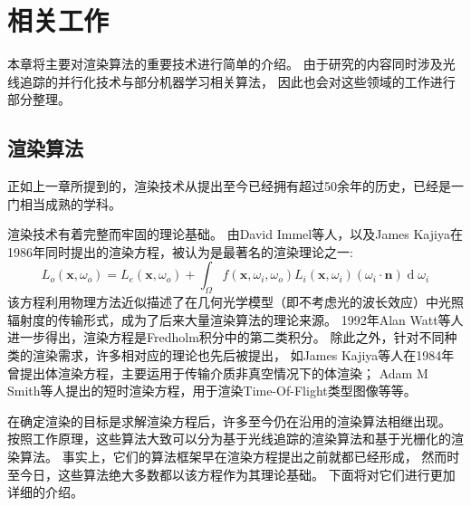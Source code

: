 \chapter{相关工作}
\label{cha:relatedwork}
本章将主要对渲染算法的重要技术进行简单的介绍。
由于研究的内容同时涉及光线追踪的并行化技术与部分机器学习相关算法，
因此也会对这些领域的工作进行部分整理。

\section{渲染算法}

正如上一章所提到的，渲染技术从提出至今已经拥有超过50余年的历史，已经是一门相当成熟的学科。


渲染技术有着完整而牢固的理论基础。
由David Immel等人\cite{immel1986radiosity}，以及James Kajiya\cite{kajiya1986rendering}在1986年同时提出的渲染方程，被认为是最著名的渲染理论之一:
\begin{equation}
    L_o(\mathbf{x}, \omega_o)=L_e(\mathbf{x},\omega_o)+\int_{\Omega} f(\mathbf{x}, \omega_i, \omega_o) L_i(\mathbf{x}, \omega_i) (\omega_i \cdot \mathbf{n}) \operatorname d\omega_i
\end{equation}
该方程利用物理方法近似描述了在几何光学模型（即不考虑光的波长效应）中光照辐射度的传输形式，成为了后来大量渲染算法的理论来源。
1992年Alan Watt等人进一步得出，渲染方程是Fredholm积分中的第二类积分\cite{Fredholm}。
除此之外，针对不同种类的渲染需求，许多相对应的理论也先后被提出，
如James Kajiya等人在1984年曾提出体渲染方程\cite{Kajiya:1984:RTV:800031.808594}，主要运用于传输介质非真空情况下的体渲染；
Adam M Smith等人提出的短时渲染方程\cite{smith2008transient}，用于渲染Time-Of-Flight类型图像等等。



在确定渲染的目标是求解渲染方程后，许多至今仍在沿用的渲染算法相继出现。
按照工作原理，这些算法大致可以分为基于光线追踪的渲染算法和基于光栅化的渲染算法。   
事实上，它们的算法框架早在渲染方程提出之前就都已经形成，
然而时至今日，这些算法绝大多数都以该方程作为其理论基础。
下面将对它们进行更加详细的介绍。

